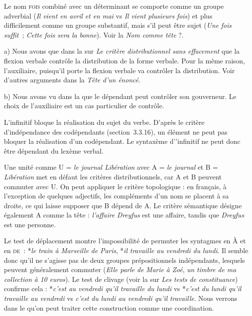 {     Le nom \textsc{fois} combiné avec un déterminant se comporte comme un groupe adverbial (\textit{Il vient en avril et en mai} vs \textit{Il vient plusieurs fois}) et plus difficilement comme un groupe substantif, mais s’il peut être sujet (\textit{Une fois suffit~}; \textit{Cette fois sera la bonne}). Voir la  \textit{Nom comme tête} ?.

     a) Nous avons que dans la  sur \textit{Le critère distributionnel sans effacement} que la flexion verbale contrôle la distribution de la forme verbale. Pour la même raison, l’auxiliaire, puisqu’il porte la flexion verbale va contrôler la distribution. Voir d’autres arguments dans la  \textit{Tête d’un énoncé}.

    b) Nous avons vu dans la  que le dépendant peut contrôler son gouverneur. Le choix de l’auxiliaire est un cas particulier de contrôle.

     L’infinitif bloque la réalisation du sujet du verbe. D’après le critère d’indépendance des codépendants (section~3.3.16), un élément ne peut pas bloquer la réalisation d’un codépendant. Le syntaxème d’’infinitif ne peut donc être dépendant du lexème verbal.

     Une unité comme U = \textit{le journal Libération} avec A = \textit{le journal} et B = \textit{Libération} met en défaut les critères distributionnels, car A et B peuvent commuter avec U. On peut appliquer le critère topologique : en français, à l’exception de quelques adjectifs, les compléments d’un nom se placent à sa droite, ce qui laisse supposer que B dépend de A. Le critère sémantique désigne également A comme la tête : \textit{l’affaire Dreyfus} est une affaire, tandis que \textit{Dreyfus} est une personne.

     Le test de déplacement montre l’impossibilité de permuter les syntagmes en À et en \textsc{de~}: *\textit{le train à Marseille de Paris}, *\textit{il travaille au vendredi du lundi}. Il semble donc qu’il ne s’agisse pas de deux groupes prépositionnels indépendants, lesquels peuvent généralement commuter (\textit{Elle parle de Marie à Zoé}, \textit{un timbre de ma collection à 10 euros}). Le test de clivage (voir la  sur \textit{Les tests de constituance}) confirme cela : *\textit{c’est au vendredi qu’il travaille du lundi} vs *\textit{c’est du lundi qu’il travaille au vendredi} vs \textit{c’est du lundi au vendredi qu’il travaille}. Nous verrons dans le  qu’on peut traiter cette construction comme une coordination.

}
